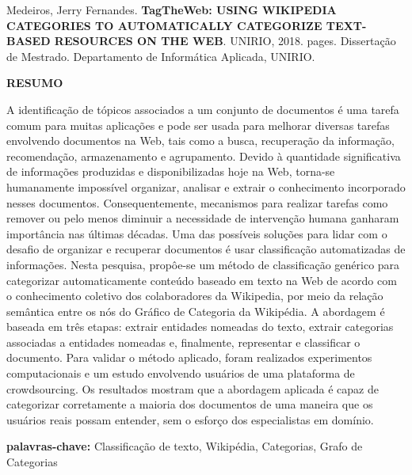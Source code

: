 Medeiros, Jerry Fernandes. \textbf{TagTheWeb: USING WIKIPEDIA CATEGORIES TO AUTOMATICALLY CATEGORIZE TEXT-BASED RESOURCES ON THE WEB}. UNIRIO, 2018. \pageref{LastPage} pages. Dissertação de Mestrado. Departamento de Informática Aplicada, UNIRIO.
\vspace{25pt}
\begin{center}
    \textbf{RESUMO}
    \vspace{25pt}
\end{center}

A identificação de tópicos associados a um conjunto de documentos é uma tarefa comum para muitas aplicações e pode ser usada para melhorar diversas tarefas envolvendo documentos na Web, tais como a busca, recuperação da informação, recomendação, armazenamento e agrupamento. Devido à quantidade significativa de informações produzidas e disponibilizadas hoje na Web, torna-se humanamente impossível organizar, analisar e extrair o conhecimento incorporado nesses documentos. Consequentemente, mecanismos para realizar tarefas como remover ou pelo menos diminuir a necessidade de intervenção humana ganharam importância nas últimas décadas. Uma das possíveis soluções para lidar com o desafio de organizar e recuperar documentos é usar classificação automatizadas de informações. Nesta pesquisa, propôe-se um método de classificação genérico para categorizar automaticamente conteúdo baseado em texto na Web de acordo com o conhecimento coletivo dos colaboradores da Wikipedia, por meio da relação semântica entre os nós do Gráfico de Categoria da Wikipédia. A abordagem é baseada em três etapas: extrair entidades nomeadas do texto, extrair categorias associadas a entidades nomeadas e, finalmente, representar e classificar o documento. Para validar o método aplicado, foram realizados experimentos computacionais e um estudo envolvendo usuários de uma plataforma de crowdsourcing. Os resultados mostram que a abordagem aplicada é capaz de categorizar corretamente a maioria dos documentos de uma maneira que os usuários reais possam entender, sem o esforço dos especialistas em domínio.
\vspace{20pt}

\textbf{palavras-chave:} Classificação de texto, Wikipédia, Categorias, Grafo de Categorias


